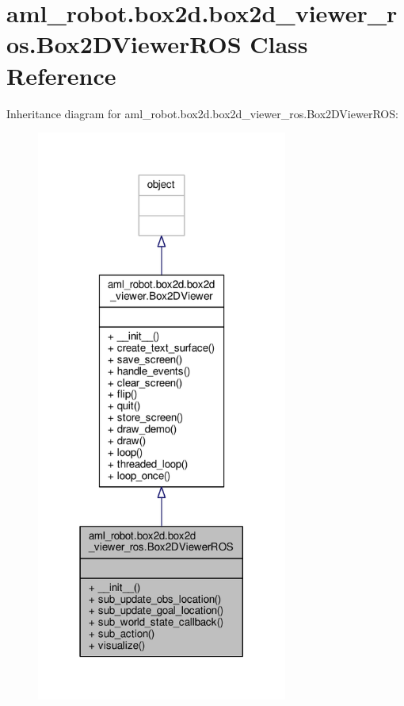 \hypertarget{classaml__robot_1_1box2d_1_1box2d__viewer__ros_1_1_box2_d_viewer_r_o_s}{\section{aml\-\_\-robot.\-box2d.\-box2d\-\_\-viewer\-\_\-ros.\-Box2\-D\-Viewer\-R\-O\-S Class Reference}
\label{classaml__robot_1_1box2d_1_1box2d__viewer__ros_1_1_box2_d_viewer_r_o_s}
}


Inheritance diagram for aml\-\_\-robot.\-box2d.\-box2d\-\_\-viewer\-\_\-ros.\-Box2\-D\-Viewer\-R\-O\-S\-:\nopagebreak
\begin{figure}[H]
\begin{center}
\leavevmode
\includegraphics[width=234pt]{classaml__robot_1_1box2d_1_1box2d__viewer__ros_1_1_box2_d_viewer_r_o_s__inherit__graph}
\end{center}
\end{figure}


